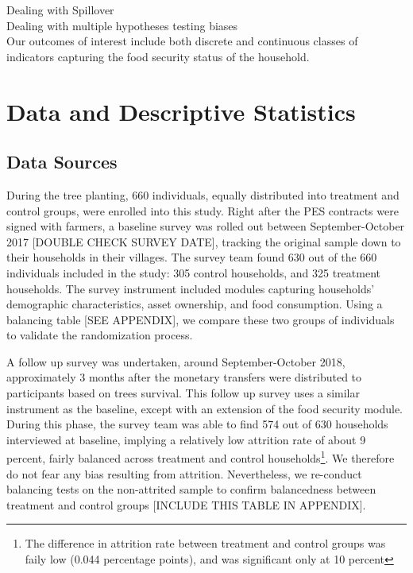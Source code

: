 \documentclass[preprint,12pt]{elsarticle}
\begin{document}

Dealing with Spillover \\

Dealing with multiple hypotheses testing biases \\


Our outcomes of interest include both discrete and continuous classes of indicators capturing the food security status of the household. \\


\newpage 
\section{Data and Descriptive Statistics}

\subsection{Data Sources}

During the tree planting, 660 individuals, equally distributed into treatment and control groups, were enrolled into this study. Right after the PES contracts were signed with farmers, a baseline survey was rolled out between September-October 2017 [DOUBLE CHECK SURVEY DATE], tracking the original sample down to their households in their villages. The survey team found 630 out of the 660 individuals included in the study: 305 control households, and 325 treatment households.  The survey instrument included modules capturing households' demographic characteristics, asset ownership, and food consumption. Using a balancing table [SEE APPENDIX], we compare these two groups of individuals to validate the randomization process. \par

A follow up survey was undertaken, around September-October 2018, approximately 3 months after the monetary transfers were distributed to participants based on trees survival. This follow up survey uses a similar instrument as the baseline, except with an extension of the food security module. During this phase, the survey team was able to find 574 out of 630 households interviewed at baseline, implying a relatively low attrition rate of about 9 percent, fairly balanced across treatment and control households\footnote{The difference in attrition rate between treatment and control groups was faily low (0.044 percentage points), and was significant only at 10 percent}. We therefore do not fear any bias resulting from attrition.  Nevertheless, we re-conduct balancing tests on the non-attrited sample to confirm balancedness between treatment and control groups [INCLUDE THIS TABLE IN APPENDIX].
\end{document}
